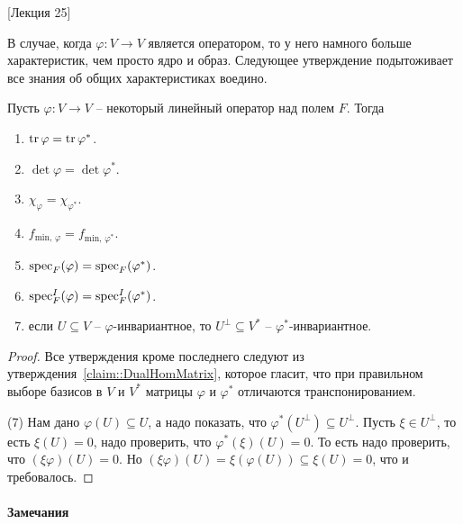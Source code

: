 [Лекция 25]


В случае, когда $\varphi\colon V\to V$ является оператором, то у него намного больше характеристик, чем просто ядро и образ.
Следующее утверждение подытоживает все знания об общих характеристиках воедино.

\begin{claim}
Пусть $\varphi\colon V\to V$ -- некоторый линейный оператор над полем $F$.
Тогда
\begin{enumerate}
\item $\operatorname{tr} \varphi = \operatorname{tr} \varphi^*$.

\item $\det \varphi = \det \varphi^*$.

\item $\chi_\varphi = \chi_{\varphi^*}$.

\item $f_{\text{min},\,\varphi} = f_{\text{min},\,\varphi^*}$.

\item $\operatorname{spec}_F(\varphi) = \operatorname{spec}_F(\varphi^*)$.

\item $\operatorname{spec}_F^I(\varphi) = \operatorname{spec}_F^I(\varphi^*)$.

\item если $U\subseteq V$ -- $\varphi$-инвариантное, то $U^\bot\subseteq V^*$ -- $\varphi^*$-инвариантное.
\end{enumerate}
\end{claim}
\begin{proof}
Все утверждения кроме последнего следуют из утверждения~\ref{claim::DualHomMatrix}, которое гласит, что при правильном выборе базисов в $V$ и $V^*$ матрицы $\varphi$ и $\varphi^*$ отличаются транспонированием.

(7) Нам дано $\varphi(U)\subseteq U$, а надо показать, что $\varphi^*(U^\bot)\subseteq U^\bot$.
Пусть $\xi\in U^\bot$, то есть $\xi(U) = 0$, надо проверить, что $\varphi^*(\xi)(U) = 0$.
То есть надо проверить, что $(\xi \varphi)(U) = 0$.
Но $(\xi \varphi) (U) = \xi(\varphi(U))\subseteq \xi(U) = 0$, что и требовалось.
\end{proof}

\paragraph{Замечания}

